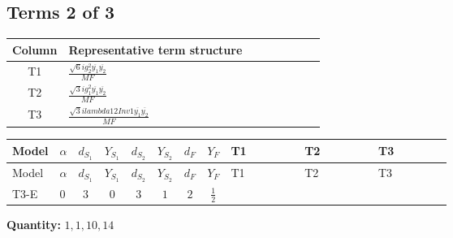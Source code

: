 \documentclass[8pt]{article}
\begin{document}
\begin{landscape}
\subsection*{Terms 2 of 3}
\begin{center}
\begin{tabular}{@{}c >{\raggedright\arraybackslash}p{0.82\linewidth}@{}}
\toprule
Column & Representative term structure \\
\midrule
T1 & \(\displaystyle \frac{\sqrt{6} i g_{2}^{2} \overline{y_{1}} \overline{y_{2}}}{MF}\) \\
\midrule
T2 & \(\displaystyle \frac{\sqrt{3} i g_{1}^{2} \overline{y_{1}} \overline{y_{2}}}{MF}\) \\
\midrule
T3 & \(\displaystyle \frac{\sqrt{3} i lambda12Inv1 \overline{y_{1}} \overline{y_{2}}}{MF}\) \\
\midrule
\bottomrule
\end{tabular}
\end{center}
\smallskip
\tiny
\begin{longtable}{@{}llcccccc >{\raggedright\arraybackslash}p{0.21\linewidth} >{\raggedright\arraybackslash}p{0.21\linewidth} >{\raggedright\arraybackslash}p{0.21\linewidth}@{}}
\toprule
Model & $\alpha$ & $d_{S_1}$ & $Y_{S_1}$ & $d_{S_2}$ & $Y_{S_2}$ & $d_F$ & $Y_F$ & T1 & T2 & T3 \\
\midrule
\endfirsthead
\toprule
Model & $\alpha$ & $d_{S_1}$ & $Y_{S_1}$ & $d_{S_2}$ & $Y_{S_2}$ & $d_F$ & $Y_F$ & T1 & T2 & T3 \\
\midrule
\endhead
T3-E & $0$ & $3$ & $0$ & $3$ & $1$ & $2$ & $\frac{1}{2}$ & \scriptsize\adjustbox{max width=\linewidth}{$\begin{gathered} - \frac{\sqrt{6} i g_{2}^{2} \overline{y_{1}} \overline{y_{2}}}{3 MF}\end{gathered}$} & \scriptsize\adjustbox{max width=\linewidth}{$\begin{gathered} - \frac{\sqrt{3} i g_{1}^{2} \overline{y_{1}} \overline{y_{2}}}{8 MF}\end{gathered}$} & \scriptsize\adjustbox{max width=\linewidth}{$\begin{gathered} \frac{\sqrt{3} i lambda12Inv1 \overline{y_{1}} \overline{y_{2}}}{6 MF}\end{gathered}$} \\
\midrule
\bottomrule
\end{longtable}
\clearpage
\noindent\textbf{Quantity: }$\mathrm{1,1,10,14}$\par\smallskip

\end{landscape}
\end{document}
